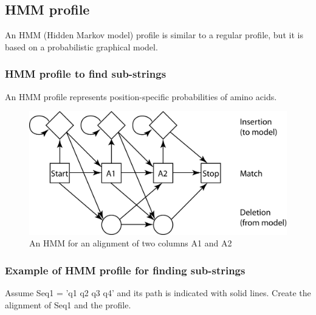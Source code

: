 %
%

%
%
\subsection{HMM profile}
An HMM (Hidden Markov model) profile is similar to a regular profile, but it is based on a probabilistic graphical model.

%
%
\subsubsection*{HMM profile to find sub-strings}
An HMM profile represents position-specific probabilities of amino acids.

\begin{figure}[H]
  \centering
      \includegraphics[width=0.5 \textwidth]{fig13/HMM_profile_example_1.png}
  \caption{An HMM for an alignment of two columns A1 and A2}
\end{figure}

%
%
\subsubsection*{Example of HMM profile for finding sub-strings}
Assume Seq1 = ’q1 q2 q3 q4’ and its path is indicated with solid lines. Create the alignment of Seq1 and the profile.

